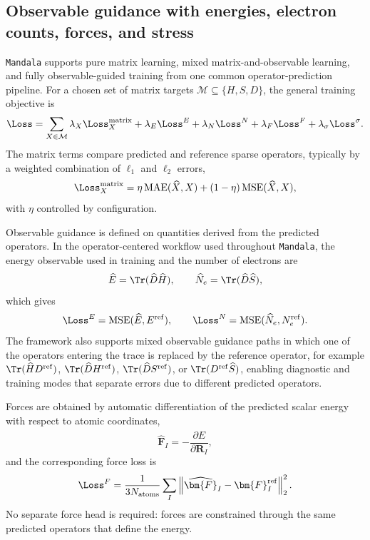 \subsection{Observable guidance with energies, electron counts, forces, and stress}
\label{subsec:training_objectives}

\texttt{Mandala} supports pure matrix learning, mixed matrix-and-observable learning, and
fully observable-guided training from one common operator-prediction pipeline.
For a chosen set of matrix targets $\mathcal{M} \subseteq \{H,S,D\}$, the
general training objective is
\begin{equation}
\Loss
=
\sum_{X \in \mathcal{M}} \lambda_X \Loss_X^{\mathrm{matrix}}
+ \lambda_E \Loss^{E}
+ \lambda_N \Loss^{N}
+ \lambda_F \Loss^{F}
+ \lambda_{\sigma} \Loss^{\sigma}.
\end{equation}
The matrix terms compare predicted and reference sparse operators, typically by
a weighted combination of $\ell_1$ and $\ell_2$ errors,
\begin{equation}
\Loss_X^{\mathrm{matrix}}
=
\eta \, \mathrm{MAE}(\widehat{X},X)
+ (1-\eta)\, \mathrm{MSE}(\widehat{X},X),
\end{equation}
with $\eta$ controlled by configuration.

Observable guidance is defined on quantities derived from the predicted
operators. In the operator-centered workflow used throughout \texttt{Mandala}, the
energy observable used in training and the number of electrons are
\begin{equation}
\widehat{E} = \Tr(\widehat{D}\widehat{H}),
\qquad
\widehat{N}_e = \Tr(\widehat{D}\widehat{S}),
\end{equation}
which gives
\begin{equation}
\Loss^E = \mathrm{MSE}(\widehat{E},E^{\mathrm{ref}}),
\qquad
\Loss^N = \mathrm{MSE}(\widehat{N}_e,N_e^{\mathrm{ref}}).
\end{equation}
The framework also supports mixed observable guidance paths in which one of the
operators entering the trace is replaced by the reference operator, for example
$\Tr(\widehat{H} D^{\mathrm{ref}})$,
$\Tr(\widehat{D} H^{\mathrm{ref}})$,
$\Tr(\widehat{D} S^{\mathrm{ref}})$, or
$\Tr(D^{\mathrm{ref}} \widehat{S})$, enabling diagnostic and training modes
that separate errors due to different predicted operators.

Forces are obtained by automatic differentiation of the predicted scalar energy
with respect to atomic coordinates,
\begin{equation}
\widehat{\bm{F}}_I
=
-\frac{\partial \widehat{E}}{\partial \bm{R}_I},
\end{equation}
and the corresponding force loss is
\begin{equation}
\Loss^F
=
\frac{1}{3N_{\mathrm{atoms}}}
\sum_I
\left\|
\widehat{\bm{F}}_I - \bm{F}_I^{\mathrm{ref}}
\right\|_2^2.
\end{equation}
No separate force head is required: forces are constrained through the same
predicted operators that define the energy.


